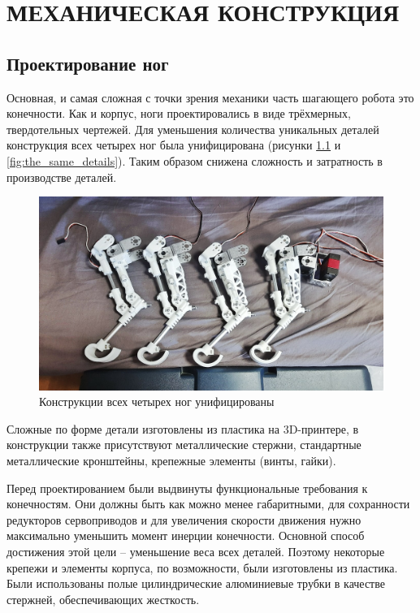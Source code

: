\chapter{\MakeUppercase{Механическая конструкция}}
\section{Проектирование ног} \label{sec:leg_design}
Основная, и самая сложная с точки зрения механики часть шагающего робота это конечности. Как и корпус, ноги проектировались в виде трёхмерных, твердотельных чертежей. Для уменьшения количества уникальных деталей конструкция всех четырех ног была унифицирована (рисунки \ref{fig:the_same_legs} и \ref{fig:the_same_details}). Таким образом снижена сложность и затратность в производстве деталей. 

\begin{figure}[h]
    \centering
    \includegraphics[width=\textwidth]{chapter_mechanics_construction/figure11.jpg}
    \caption{Конструкции всех четырех ног унифицированы}
    \label{fig:the_same_legs}
\end{figure}

Сложные по форме детали изготовлены из пластика на 3D-принтере, в конструкции также присутствуют металлические стержни, стандартные металлические кронштейны, крепежные элементы (винты, гайки).

Перед проектированием были выдвинуты функциональные требования к конечностям. Они должны быть как можно менее габаритными, для сохранности редукторов сервоприводов и для увеличения скорости движения нужно максимально уменьшить момент инерции конечности. Основной способ достижения этой цели -- уменьшение веса всех деталей. Поэтому некоторые крепежи и элементы корпуса, по возможности, были изготовлены из пластика. Были использованы полые цилиндрические алюминиевые трубки в качестве стержней, обеспечивающих жесткость.

